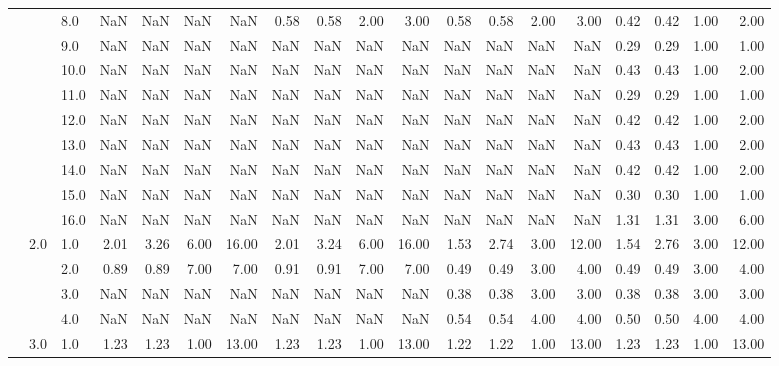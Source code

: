 \begin{tabular}{lllrrrrrrrrrrrrrrrr}
     &     & 8.0  &        NaN &       NaN &   NaN &    NaN &       0.58 &      0.58 & 2.00 &   3.00 &       0.58 &      0.58 & 2.00 &   3.00 &       0.42 &      0.42 & 1.00 &   2.00 \\
     &     & 9.0  &        NaN &       NaN &   NaN &    NaN &        NaN &       NaN &  NaN &    NaN &        NaN &       NaN &  NaN &    NaN &       0.29 &      0.29 & 1.00 &   1.00 \\
     &     & 10.0 &        NaN &       NaN &   NaN &    NaN &        NaN &       NaN &  NaN &    NaN &        NaN &       NaN &  NaN &    NaN &       0.43 &      0.43 & 1.00 &   2.00 \\
     &     & 11.0 &        NaN &       NaN &   NaN &    NaN &        NaN &       NaN &  NaN &    NaN &        NaN &       NaN &  NaN &    NaN &       0.29 &      0.29 & 1.00 &   1.00 \\
     &     & 12.0 &        NaN &       NaN &   NaN &    NaN &        NaN &       NaN &  NaN &    NaN &        NaN &       NaN &  NaN &    NaN &       0.42 &      0.42 & 1.00 &   2.00 \\
     &     & 13.0 &        NaN &       NaN &   NaN &    NaN &        NaN &       NaN &  NaN &    NaN &        NaN &       NaN &  NaN &    NaN &       0.43 &      0.43 & 1.00 &   2.00 \\
     &     & 14.0 &        NaN &       NaN &   NaN &    NaN &        NaN &       NaN &  NaN &    NaN &        NaN &       NaN &  NaN &    NaN &       0.42 &      0.42 & 1.00 &   2.00 \\
     &     & 15.0 &        NaN &       NaN &   NaN &    NaN &        NaN &       NaN &  NaN &    NaN &        NaN &       NaN &  NaN &    NaN &       0.30 &      0.30 & 1.00 &   1.00 \\
     &     & 16.0 &        NaN &       NaN &   NaN &    NaN &        NaN &       NaN &  NaN &    NaN &        NaN &       NaN &  NaN &    NaN &       1.31 &      1.31 & 3.00 &   6.00 \\
     & 2.0 & 1.0  &       2.01 &      3.26 &  6.00 &  16.00 &       2.01 &      3.24 & 6.00 &  16.00 &       1.53 &      2.74 & 3.00 &  12.00 &       1.54 &      2.76 & 3.00 &  12.00 \\
     &     & 2.0  &       0.89 &      0.89 &  7.00 &   7.00 &       0.91 &      0.91 & 7.00 &   7.00 &       0.49 &      0.49 & 3.00 &   4.00 &       0.49 &      0.49 & 3.00 &   4.00 \\
     &     & 3.0  &        NaN &       NaN &   NaN &    NaN &        NaN &       NaN &  NaN &    NaN &       0.38 &      0.38 & 3.00 &   3.00 &       0.38 &      0.38 & 3.00 &   3.00 \\
     &     & 4.0  &        NaN &       NaN &   NaN &    NaN &        NaN &       NaN &  NaN &    NaN &       0.54 &      0.54 & 4.00 &   4.00 &       0.50 &      0.50 & 4.00 &   4.00 \\
     & 3.0 & 1.0  &       1.23 &      1.23 &  1.00 &  13.00 &       1.23 &      1.23 & 1.00 &  13.00 &       1.22 &      1.22 & 1.00 &  13.00 &       1.23 &      1.23 & 1.00 &  13.00 \\
\bottomrule
\end{tabular}
